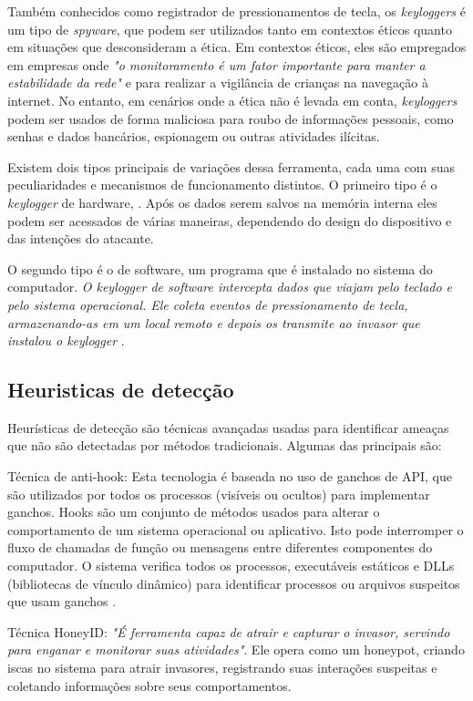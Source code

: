 \documentclass[12pt]{article}
\begin{document}
Também conhecidos como registrador de pressionamentos de tecla, os \textit{keyloggers} é um tipo de \textit{spyware}, que podem ser utilizados tanto em contextos éticos quanto em situações que desconsideram a ética. Em contextos éticos, eles são empregados em empresas onde \textit{"o monitoramento é um fator importante para manter a estabilidade da rede"} \citep{tuli2013system} e para realizar a vigilância de crianças na navegação à internet. No entanto, em cenários onde a ética não é levada em conta, \textit{keyloggers} podem ser usados de forma maliciosa para roubo de informações pessoais, como senhas e dados bancários, espionagem ou outras atividades ilícitas.

Existem dois tipos principais de variações dessa ferramenta, cada uma com suas peculiaridades e mecanismos de funcionamento distintos. O primeiro tipo é o \textit{keylogger} de hardware, \textit{}\citep{singh2021keylogger}. Após os dados serem salvos na memória interna eles podem ser acessados de várias maneiras, dependendo do design do dispositivo e das intenções do atacante.

O segundo tipo é o de software, um programa que é instalado no sistema do computador. \textit{O keylogger de software intercepta dados que viajam pelo teclado e pelo sistema operacional. Ele coleta eventos de pressionamento de tecla, armazenando-as em um local remoto e depois os transmite ao invasor que instalou o keylogger} \citep{ahmed2014survey}.

\subsection{Heuristicas de detecção}
Heurísticas de detecção são técnicas avançadas usadas para identificar ameaças que não são detectadas por métodos tradicionais. Algumas das principais são:

Técnica de anti-hook: Esta tecnologia é baseada no uso de ganchos de API, que são utilizados por todos os processos (visíveis ou ocultos) para implementar ganchos. Hooks são um conjunto de métodos usados para alterar o comportamento de um sistema operacional ou aplicativo. Isto pode interromper o fluxo de chamadas de função ou mensagens entre diferentes componentes do computador. O sistema verifica todos os processos, executáveis estáticos e DLLs (bibliotecas de vínculo dinâmico) para identificar processos ou arquivos suspeitos que usam ganchos \citep{solairaj2016keyloggers}.

Técnica HoneyID: \citep{10124477} \textit{"É ferramenta capaz de atrair e capturar o invasor, servindo para enganar e monitorar suas atividades"}. Ele opera como um honeypot, criando iscas no sistema para atrair invasores, registrando suas interações suspeitas e coletando informações sobre seus comportamentos.
\end{document}

